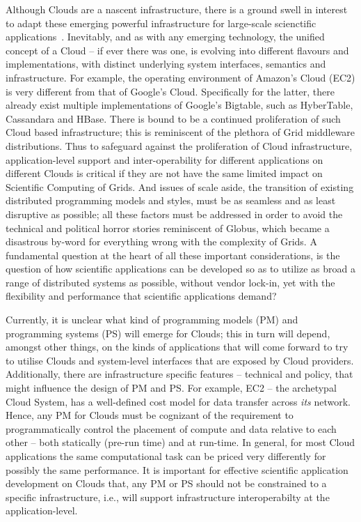 \documentclass[conference,final]{IEEEtran}
\begin{document}
Although Clouds are a nascent infrastructure, there is a ground swell
in interest to adapt these emerging powerful infrastructure for
large-scale scienctific applications~\cite{montagecloud}.  Inevitably,
and as with any emerging technology, the unified concept of a Cloud --
if ever there was one, is evolving into different flavours and
implementations, with distinct underlying system interfaces, semantics
and infrastructure. For example, the operating environment of Amazon's
Cloud (EC2) is very different from that of Google's
Cloud. Specifically for the latter, there already exist multiple
implementations of Google's Bigtable, such as HyberTable, Cassandara
and HBase. There is bound to be a continued proliferation of such
Cloud based infrastructure; this is reminiscent of the plethora of
Grid middleware distributions. %
Thus to safeguard against the proliferation of Cloud infrastructure,
application-level support and inter-operability for different
applications on different Clouds is critical if they are not have the
same limited impact on Scientific Computing of Grids. And issues of
scale aside, the transition of existing distributed programming models
and styles, must be as seamless and as least disruptive as possible;
all these factors must be addressed in order to avoid the technical
and political horror stories reminiscent of Globus, which became a
disastrous by-word for everything wrong with the complexity of Grids.
A fundamental question at the heart of all these important
considerations, is the question of how scientific applications can be
developed so as to utilize as broad a range of distributed systems as
possible, without vendor lock-in, yet with the flexibility and
performance that scientific applications demand?

Currently, it is unclear what kind of programming models (PM) and
programming systems (PS) will emerge for Clouds; this in turn will
depend, amongst other things, on the kinds of applications that will
come forward to try to utilise Clouds and system-level interfaces that
are exposed by Cloud providers.  Additionally, there are
infrastructure specific features -- technical and policy, that might
influence the design of PM and PS. For example, EC2 -- the archetypal
Cloud System, has a well-defined cost model for data transfer across
{\it its} network. Hence, any PM for Clouds must be cognizant of the
requirement to programmatically control the placement of compute and
data relative to each other -- both statically (pre-run time) and at
run-time.  In general, for most Cloud applications the same
computational task can be priced very differently for possibly the
same performance.  It is important for effective scientific
application development on Clouds that, any PM or PS should not be
constrained to a specific infrastructure, i.e., will support
infrastructure interoperabilty at the application-level.
\end{document}
